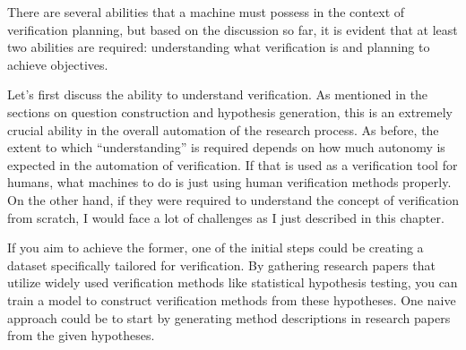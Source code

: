 

There are several abilities that a machine must possess in the context of verification planning, but based on the discussion so far, it is evident that at least two abilities are required: understanding what verification is and planning to achieve objectives.

Let's first discuss the ability to understand verification. As mentioned in the sections on question construction and hypothesis generation, this is an extremely crucial ability in the overall automation of the research process. As before, the extent to which ``understanding'' is required depends on how much autonomy is expected in the automation of verification. If that is used as a verification tool for humans, what machines to do is just using human verification methods properly. On the other hand, if they were required to understand the concept of verification from scratch, I would face a lot of challenges as I just described in this chapter. 

If you aim to achieve the former, one of the initial steps could be creating a dataset specifically tailored for verification. By gathering research papers that utilize widely used verification methods like statistical hypothesis testing, you can train a model to construct verification methods from these hypotheses. One naive approach could be to start by generating method descriptions in research papers from the given hypotheses. 

